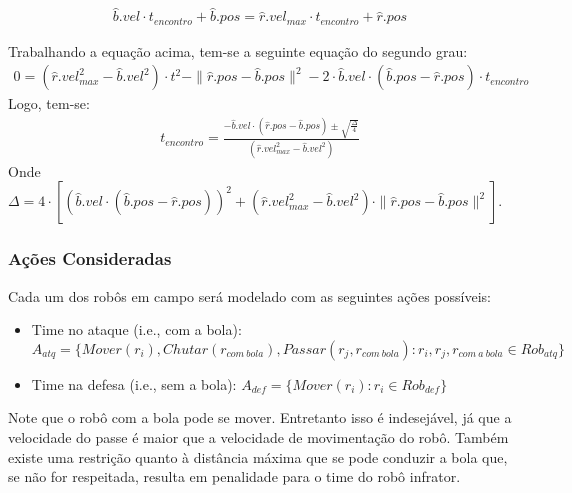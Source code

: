 \begin{gather}
  \hat{b}.vel \cdot t_{encontro} + \hat{b}.pos = \hat{r}.vel_{max} \cdot t_{encontro} + \hat{r}.pos
\end{gather}

Trabalhando a equação acima, tem-se a seguinte equação do segundo grau:
\begin{gather}  
  0 = (\hat{r}.vel^2_{max}-\hat{b}.vel^2) \cdot t^2 - \parallel \hat{r}.pos - \hat{b}.pos \parallel ^2
     - 2 \cdot \hat{b}.vel \cdot (\hat{b}.pos - \hat{r}.pos) \cdot t_{encontro}
\end{gather}
Logo, tem-se:
\begin{gather}  
  \boxed{t_{encontro} = \frac{ - \hat{b}.vel \cdot (\hat{r}.pos - \hat{b}.pos) \pm \sqrt {\frac{\Delta}{4}}}
                 {(\hat{r}.vel^2_{max} - \hat{b}.vel^2)}}
\end{gather}
Onde $\Delta = 4 \cdot [ ( \hat{b}.vel \cdot (\hat{b}.pos - \hat{r}.pos)) ^2 +
           (\hat{r}.vel_{max}^2 - \hat{b}.vel^2) \cdot \parallel \hat{r}.pos - \hat{b}.pos \parallel ^2]$.

\subsubsection{Ações Consideradas}
Cada um dos robôs em campo será modelado com as seguintes ações possíveis:
\begin{itemize}
  \item Time no ataque (i.e., com a bola):\\
        $A_{atq} = \lbrace Mover(r_i), Chutar(r_{com{\ }bola}), Passar(r_j,r_{com{\ }bola}):
                    r_i, r_j, r_{com{\ }a{\ }bola} \in Rob_{atq}\rbrace$

  \item Time na defesa (i.e., sem a bola):
        $A_{def} = \lbrace Mover(r_i): r_i \in Rob_{def}\rbrace$
\end{itemize}


Note que o robô com a bola pode se mover. Entretanto isso é indesejável, já que
a velocidade do passe é maior que a velocidade de movimentação do robô. Também existe uma
restrição quanto à distância máxima que se pode conduzir a bola que, se não
for respeitada, resulta em penalidade para o time do robô infrator.

